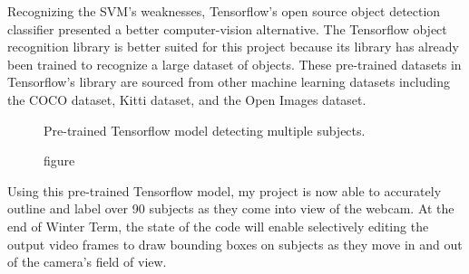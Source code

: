 \documentclass{article}
\begin{document}
  Recognizing the SVM's weaknesses, Tensorflow's open source object detection classifier presented a better computer-vision alternative. \cite{tensorflow}
  The Tensorflow object recognition library is better suited for this project because its library has already been trained to recognize a large dataset of objects. \cite{convolutional_object_detectors}
  These pre-trained datasets in Tensorflow's library are sourced from other machine learning datasets including the COCO dataset, Kitti dataset, and the Open Images dataset. \cite{coco} \cite{open_images} \cite{kitti}

  \begin{figure}[h]
    \centering
    \caption{figure}{Pre-trained Tensorflow model detecting multiple subjects.}
    \label{tf-detect}
  \end{figure}


  Using this pre-trained Tensorflow model, my project is now able to accurately outline and label over 90 subjects as they come into view of the webcam.
  At the end of Winter Term, the state of the code will enable selectively editing the output video frames to draw bounding boxes on subjects as they move in and out of the camera's field of view.
\end{document}
